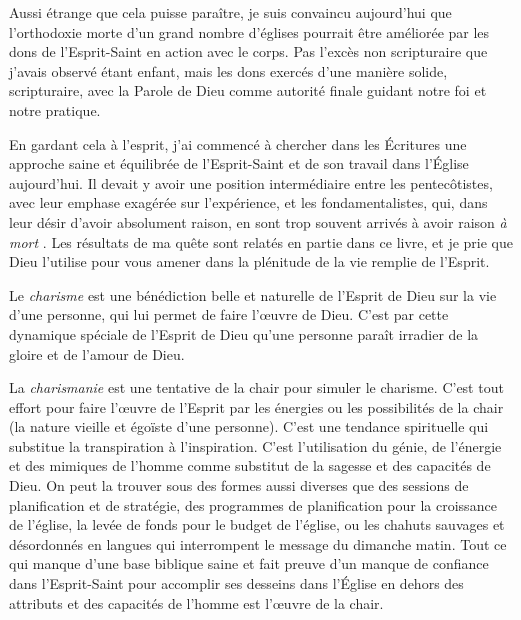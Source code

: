 Aussi étrange que cela puisse paraître, je suis convaincu aujour\-d'hui que
 l'orthodoxie morte d'un grand nombre d'églises pourrait être améliorée par les
 dons de l'Esprit-Saint en action avec le corps. Pas l'excès non scripturaire que
 j'avais observé étant enfant, mais les dons exercés d'une manière solide,
 scripturaire, avec la Parole de Dieu comme autorité finale guidant notre foi et
 notre pratique.

\begin{specialpar}{}
En gardant cela à l'esprit, j'ai commencé à chercher dans les Écritures une
 approche saine et équilibrée de l'Esprit-Saint et de son travail dans l'Église
 aujourd'hui. Il devait y avoir une position inter\-mé\-di\-aire entre les
 pentecôtistes, avec leur emphase exagérée sur l'ex\-pé\-rience, et les
 fondamentalistes, qui, dans leur désir d'avoir absolument raison,
 en sont trop souvent arrivés à avoir raison \emph{à mort}
 .
 Les résultats de ma quête sont relatés en partie dans ce livre, et je prie que
 Dieu l'utilise pour vous amener dans la plénitude de la vie remplie de
 l'Esprit.
\end{specialpar}

Le \emph{charisme} est une bénédiction belle et naturelle de l'Esprit de Dieu
 sur la vie d'une personne, qui lui permet de faire l'œuvre de Dieu. C'est par
 cette dynamique spéciale de l'Esprit de Dieu qu'une personne paraît irradier de
 la gloire et de l'amour de Dieu.

La \emph{charismanie} est une tentative de la chair pour simuler le charisme.
 C'est tout effort pour faire l'œuvre de l'Esprit par les énergies ou les
 possibilités de la chair (la nature vieille et égoïste d'une personne). C'est
 une tendance spirituelle qui substitue la transpiration à l'inspiration. C'est
 l'utilisation du génie, de l'énergie et des mimiques de l'homme comme substitut
 de la sagesse et des capacités de Dieu. On peut la trouver sous des formes
 aussi diverses que des sessions de planification et de stratégie, des
 programmes de planification pour la croissance de l'église, la levée de fonds
 pour le budget de l'église, ou les chahuts sauvages et désordonnés en langues
 qui interrompent le message du dimanche matin. Tout ce qui manque d'une base
 biblique saine et fait preuve d'un manque de confiance dans l'Esprit-Saint pour
 accomplir ses desseins dans l'Église en dehors des attributs et des capacités
 de l'homme est l'œuvre de la chair.

